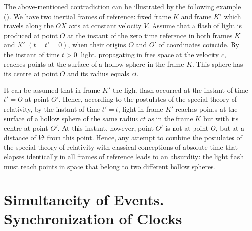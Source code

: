 The above-mentioned contradiction can be illustrated by the following example (). We have two inertial frames of reference: fixed frame $K$ and frame $K'$ which travels along the $OX$ axis at constant velocity $V$. Assume that a flash of light is produced at point $O$ at the instant of the zero time reference in both frames $K$ and $K'$ $(t = t' = 0)$, when their origins $O$ and $O'$ of coordinates coincide. By the instant of time $t > 0$, light, propagating in free space at the velocity $c$, reaches points at the surface of a hollow sphere in the frame $K$. This sphere has its centre at point $O$ and its radius equals $ct$.

It can be assumed that in frame $K'$ the light flash occurred at the instant of time $t' = O$ at point $O'$. Hence, according to the postulates of the special theory of relativity, by the instant of time $t' = t$, light in frame $K'$ reaches points at the surface of a hollow sphere of the same radius $ct$ as in the frame $K$ but with its centre at point $O'$. At this instant, however, point $O'$ is not at point $O$, but at a distance of $Vt$ from this point. Hence, any attempt to combine the postulates of the special theory of relativity with classical conceptions of absolute time that elapses identically in all frames of reference leads to an absurdity: the light flash must  reach points in space that belong to two different hollow spheres.

\section{Simultaneity of Events. Synchronization of Clocks}
\label{sec-5.2}

